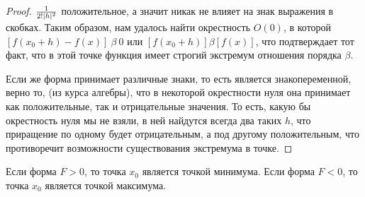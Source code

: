 \begin{proof}
${1 \over 2!|h|^2}$ положительное, а значит никак не влияет на знак выражения в скобках.
Таким образом, нам удалось найти окрестность $O(0)$, в которой $[f(x_0 + h) - f(x)]\ \beta\ 0$ или $[f(x_0 + h)] \beta [f(x)]$, что подтверждает тот факт, что в этой точке функция имеет строгий экстремум отношения порядка $\beta$.

Если же форма принимает различные знаки, то есть является знакопеременной, верно то, (из курса алгебры), что в некоторой окрестности нуля она принимает как положительные, так и отрицательные значения. То есть, какую бы окрестность нуля мы не взяли, в ней найдутся всегда два таких $h$, что приращение по одному будет отрицательным, а под другому положительным, что противоречит возможности существования экстремума в точке.
\end{proof}
\begin{consequence}
Если форма $F > 0$, то точка $x_0$ является точкой минимума. Если форма $F < 0$, то точка $x_0$ является точкой максимума.
\end{consequence}
